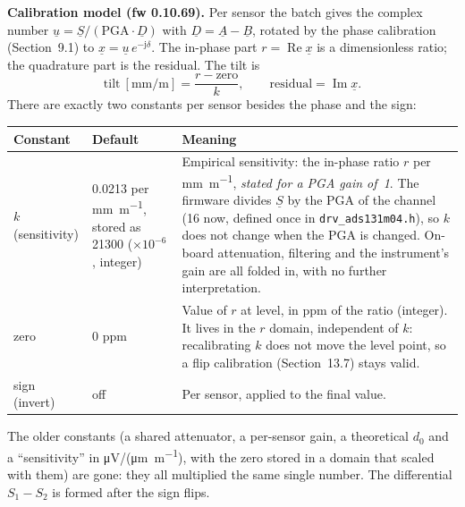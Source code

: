 \documentclass[11pt,a4paper]{article}
\begin{document}
\textbf{Calibration model (fw 0.10.69).}  Per sensor the batch gives the
complex number $\underline{u}=\underline{S}/(\mathrm{PGA}\cdot\underline{D})$
with $\underline{D}=\underline{A}-\underline{B}$, rotated by the phase
calibration (Section~9.1) to $\underline{x}=\underline{u}\,e^{-\mathrm{j}\delta}$.
The in-phase part $r=\operatorname{Re}\underline{x}$ is a dimensionless ratio;
the quadrature part is the residual.  The tilt is
\begin{equation}
  \text{tilt}\ [\si{\milli\metre\per\metre}]
  = \frac{r-\text{zero}}{k},
  \qquad \text{residual} = \operatorname{Im}\underline{x}.
  \label{eq:tilt}
\end{equation}
There are exactly two constants per sensor besides the phase and the sign:
\begin{center}
\small
\begin{tabular}{@{}p{2.6cm}p{2.6cm}p{8.6cm}@{}}
\toprule
Constant & Default & Meaning \\
\midrule
$k$ (sensitivity) & 0.0213 per \si{\milli\metre\per\metre}, stored as 21300 ($\times10^{-6}$, integer)
  & Empirical sensitivity: the in-phase ratio $r$ per \si{\milli\metre\per\metre}, \emph{stated
  for a PGA gain of~1}.  The firmware divides $\underline{S}$ by the PGA of the channel
  (16 now, defined once in \texttt{drv\_ads131m04.h}), so $k$ does not change when the PGA
  is changed.  On-board attenuation, filtering and the instrument's gain are all folded
  in, with no further interpretation. \\
zero & 0 ppm & Value of $r$ at level, in ppm of the ratio (integer).  It lives in the
  $r$ domain, independent of $k$: recalibrating $k$ does not move the level point, so a
  flip calibration (Section~13.7) stays valid. \\
sign (invert) & off & Per sensor, applied to the final value. \\
\bottomrule
\end{tabular}
\end{center}
The older constants (a shared attenuator, a per-sensor gain, a theoretical $d_0$
and a ``sensitivity'' in \si{\micro\volt}/(\si{\micro\metre\per\metre}), with the
zero stored in a domain that scaled with them) are gone: they all multiplied the
same single number.  The differential $S_1-S_2$ is formed after the sign flips.
\end{document}
